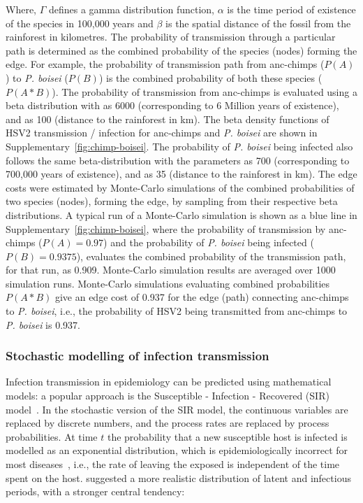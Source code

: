 \documentclass[fleqn,10pt]{wlscirep}
\begin{document}
Where, $\Gamma$ defines a gamma distribution function, $\alpha$ is the time period of existence of the species in 100,000 years and $\beta$ is the spatial distance of the fossil from the rainforest in kilometres. The probability of transmission through a particular path is determined as the combined probability of the species (nodes) forming the edge. For example, the probability of transmission path from anc-chimps ($P(A)$) to \textit{P. boisei} ($P(B)$) is the combined probability of both these species ($P(A*B)$). The probability of transmission from anc-chimps is evaluated using a beta distribution with as 6000 (corresponding to 6 Million years of existence), and  as 100 (distance to the rainforest in km). The beta density functions of HSV2 transmission / infection for anc-chimps and \textit{P. boisei} are shown in Supplementary~\cref{fig:chimp-boisei}. The probability of \textit{P. boisei} being infected also follows the same beta-distribution with the parameters as 700 (corresponding to 700,000 years of existence), and  as 35 (distance to the rainforest in km). The edge costs were estimated by Monte-Carlo simulations of the combined probabilities of two species (nodes), forming the edge, by sampling from their respective beta distributions. A typical run of a Monte-Carlo simulation is shown as a blue line in Supplementary~\cref{fig:chimp-boisei}, where the probability of transmission by anc-chimps ($P(A) = 0.97$) and the probability of \textit{P. boisei} being infected ($P(B) = 0.9375$), evaluates the combined probability of the transmission path, for that run, as 0.909.  Monte-Carlo simulation results are averaged over 1000 simulation runs. Monte-Carlo simulations evaluating combined probabilities $P(A*B)$ give an edge cost of 0.937 for the edge (path) connecting anc-chimps to \textit{P. boisei}, i.e., the probability of HSV2 being transmitted from anc-chimps to \textit{P. boisei} is 0.937.
 

\subsubsection*{Stochastic modelling of infection transmission}
Infection transmission in epidemiology can be predicted using mathematical models: a popular approach is the Susceptible - Infection - Recovered (SIR) model~\citep{Chen2008}. In the stochastic version of the SIR model, the continuous variables are replaced by discrete numbers, and the process rates are replaced by process probabilities. At time $t$ the probability that a new susceptible host is infected is modelled as an exponential distribution, which is epidemiologically incorrect for most diseases~\citep{Wearing2005,Bailey1975,sartwell1950distribution}, i.e., the rate of leaving the exposed is independent of the time spent on the host. \citet{Wearing2005} suggested a more realistic distribution of latent and infectious periods, with a stronger central tendency:
\end{document}
